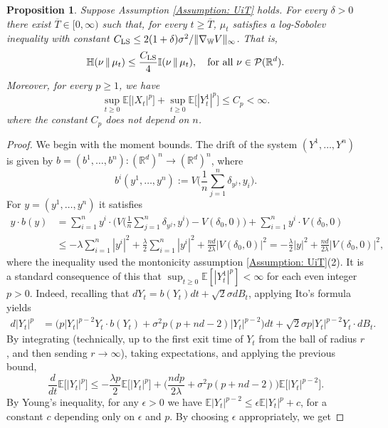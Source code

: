 \documentclass[11pt,reqno]{amsart}
\numberwithin{equation}{section}
\newtheorem{proposition}[theorem]{Proposition}
\theoremstyle{definition}
\def\E{{\mathbb E}}
\def\R{{\mathbb R}}
\newcommand{\wgrad}{\nabla_{\W}}
\newcommand{\W}{\mathbb W}
\newcommand{\ent}{ \mathbb H}
\newcommand{\fin}{\mathbb I}
\begin{document}
\begin{proposition}
\label{pr: LSI}
Suppose Assumption \ref{Assumption: UiT} holds.
For every $\delta > 0$ there exist $\overline{T} \in [0,\infty)$ such that, for every $t\geq \overline{T}$, $\mu_t$ satisfies a log-Sobolev inequality with constant $C_{\textup{LS}} \le 2(1+\delta)\sigma^2/\|\wgrad V\|_\infty$. That is, 
    \[
    \ent(\nu\,\|\,\mu_t)\leq \frac{C_{\textup{LS}}}{4}\fin(\nu\,\|\,\mu_t), \quad \text{for all } \nu\in \mathcal P(\R^d).
    \]
    Moreover, for every $p \ge 1$, we have
    \[
\sup_{t \ge 0}\E\big[|X_t|^p\big]+\sup_{t \ge 0}\E\big[|Y^1_t|^p\big] \leq C_p < \infty.
\]
where the constant $C_p$ does not depend on $n$.
\end{proposition}
\begin{proof}
We begin with the moment bounds.
The drift of the system $(Y^1,\ldots,Y^n)$ is given by $b=(b^1,\ldots,b^n) : (\R^d)^n \to (\R^d)^n$, where
\[
b^i(y^1,\ldots,y^n) := V\bigg(\frac{1}{n}\sum_{j=1}^n\delta_{y^j},y_i\bigg).
\]
For $y=(y^1,\ldots,y^n)$ it satisfies
\begin{align*}
y \cdot b(y) &= \sum_{i=1}^n y^i \cdot \bigg(V\bigg(\frac{1}{n}\sum_{j=1}^n\delta_{y^j},y^i\bigg) - V(\delta_0,0)\bigg) + \sum_{i=1}^n y^i \cdot V(\delta_0,0) \\
    &\le -\lambda\sum_{i=1}^n |y^i|^2 + \frac{\lambda}{2}\sum_{i=1}^n|y^i|^2 + \frac{nd}{2\lambda }|V(\delta_0,0)|^2 = -\frac{\lambda}{2}|y|^2 + \frac{nd}{2\lambda }|V(\delta_0,0)|^2,
\end{align*}
where the inequality used the montonicity assumption \ref{Assumption: UiT}(2). 
It is a standard consequence of this that $\sup_{t \ge 0}\E[|Y^1_t|^p] < \infty$ for each even integer $p > 0$. Indeed, recalling that $dY_t=b(Y_t)dt +\sqrt{2}\sigma dB_t$, applying Ito's formula yields
\begin{align*}
d|Y_t|^p &= \Big(p|Y_t|^{p-2}Y_t \cdot b(Y_t) + \sigma^2 p(p+nd-2) |Y_t|^{p-2}\Big)dt + \sqrt{2}\sigma p|Y_t|^{p-2}Y_t \cdot dB_t.
\end{align*}
By integrating (technically, up to the first exit time of $Y_t$ from the ball of radius $r$, and then sending $r\to\infty$), taking expectations, and applying the previous bound,
\[
\frac{d}{dt}\E\big[|Y_t|^p\big] \le -\frac{\lambda p}{2}\E\big[|Y_t|^p\big] + \Big(\frac{ndp}{2\lambda} +  \sigma^2 p(p+nd-2)\Big) \E\big[|Y_t|^{p-2}\big].
\]
By Young's inequality, for any $\epsilon > 0$ we have $\E|Y_t|^{p-2} \le \epsilon\E|Y_t|^{p} + c$, for a constant $c$ depending only on $\epsilon$ and $p$. By choosing $\epsilon$ appropriately, we get

\end{proof}
\end{document}
